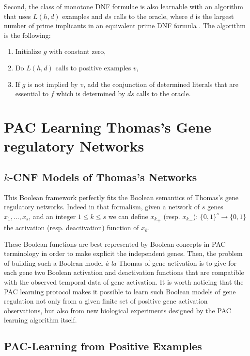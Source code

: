 \documentclass{llncs}
\begin{document}
    Second, the class of monotone DNF formulae is also learnable with an algorithm that uses $L(h,d)$ examples and $ds$ calls to the oracle,
    where $d$ is the largest number of prime implicants in an equivalent prime DNF formula \cite{Valiant84cacm}.
The algorithm is the following:
\begin{enumerate}
\item Initialize $g$ with constant zero,
\item
Do $L(h,d)$ calls to positive examples $v$,
\item
If $g$ is not implied by $v$, add the conjunction of determined literals that are essential to $f$ which is determined by $ds$ calls to the oracle.
\end{enumerate}

\section{PAC Learning Thomas's Gene regulatory Networks}

\subsection{$k$-CNF Models of Thomas's Networks}

  This Boolean framework perfectly fits the Boolean semantics of Thomas's gene regulatory networks.
  Indeed in that formalism, given a network of $s$ genes $x_1,\ldots,x_s$, and an integer $1 \leq k \leq s$ we can define ${x_k}_+$ (resp. ${x_k}_-$): $\{0,1\}^s \rightarrow\{0,1\}$ the activation (resp. deactivation) function of $x_k$.
  
  These Boolean functions are best represented by Boolean concepts in PAC terminology
  in order to make explicit the independent genes.
  Then, the problem of building such a Boolean model \emph{\`a la} Thomas of gene activation is to give for each gene
  two Boolean activation and deactivation functions that are compatible with the observed temporal data of gene activation.
It is worth noticing that the PAC learning protocol makes it possible to learn such Boolean models of gene regulation
not only from a given finite set of positive gene activation observations,
but also from new biological experiments designed by the PAC learning algorithm itself.

\subsection{PAC-Learning from Positive Examples}
\end{document}
